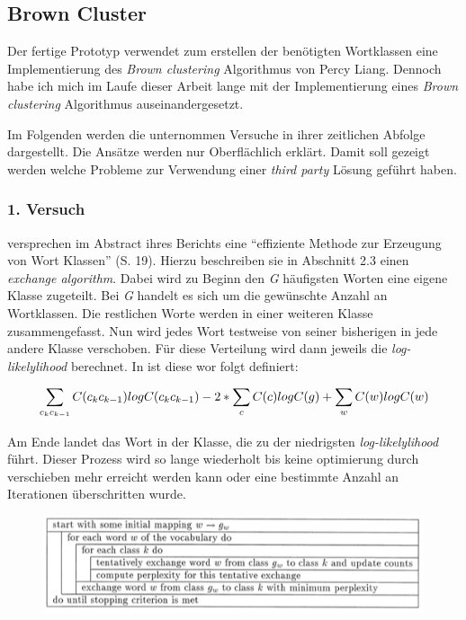 \subsection{Brown Cluster}
    Der fertige Prototyp verwendet zum erstellen der benötigten Wortklassen eine Implementierung des \emph{Brown clustering} Algorithmus von Percy Liang. Dennoch habe ich mich im Laufe dieser Arbeit lange mit der Implementierung eines \emph{Brown clustering} Algorithmus auseinandergesetzt.
    
    Im Folgenden werden die unternommen Versuche in ihrer zeitlichen Abfolge dargestellt. Die Ansätze werden nur Oberflächlich erklärt. Damit soll gezeigt werden welche Probleme zur Verwendung einer \emph{third party} Lösung geführt haben.
        
    \subsubsection*{1. Versuch}

  		\cite{speechcommunication:exchange} versprechen im Abstract ihres Berichts eine \enquote{effiziente Methode zur Erzeugung von Wort Klassen} (S. 19). Hierzu beschreiben sie in Abschnitt 2.3 einen \emph{exchange algorithm}. Dabei wird zu Beginn den \emph{G} häufigsten Worten eine eigene Klasse zugeteilt. Bei \emph{G} handelt es sich um die gewünschte Anzahl an Wortklassen. Die restlichen Worte werden in einer weiteren Klasse zusammengefasst. Nun wird jedes Wort testweise von seiner bisherigen in jede andere Klasse verschoben. Für diese Verteilung wird dann jeweils die \emph{log-likelylihood} berechnet. In \parencite[S. 22 Gleichung 5]{speechcommunication:exchange} ist diese wor folgt definiert:
        
        \begin{equation}
   			\sum_{c_k c_{k-1}} C(c_k c_{k-1}) log C(c_k c_{k-1}) \newline
            - 2 * \sum_c C(c) log C(g) \newline
            + \sum_w C(w) log C(w)
        	\label{eq:log-likelihood}
		\end{equation}
        
        Am Ende landet das Wort in der Klasse, die zu der niedrigsten \emph{log-likelylihood} führt. Dieser Prozess wird so lange wiederholt bis keine optimierung durch verschieben mehr erreicht werden kann oder eine bestimmte Anzahl an Iterationen überschritten wurde.
            
		\begin{figure}[H]
			\centering
  			\includegraphics[width=.8\linewidth]{images/exchangeAlg.png}
  			\caption{\emph{} \parencite[S. 24 Abb. 1 ]{speechcommunication:exchange}}				
			\label{fig:exchangeAlgorythm}
		\end{figure}

